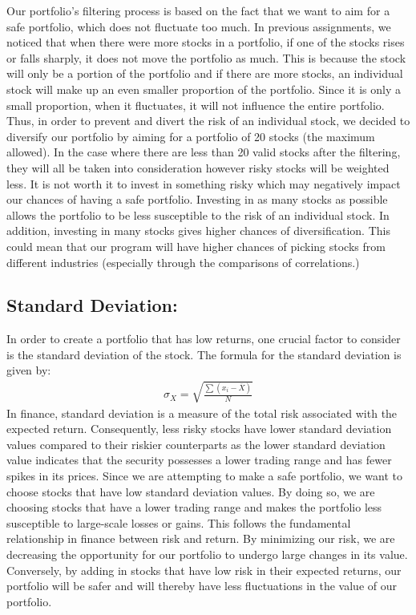 \documentclass[11pt]{article}
\begin{document}
Our portfolio's filtering process is based on the fact that we want to
aim for a safe portfolio, which does not fluctuate too much. In previous
assignments, we noticed that when there were more stocks in a portfolio,
if one of the stocks rises or falls sharply, it does not move the
portfolio as much. This is because the stock will only be a portion of
the portfolio and if there are more stocks, an individual stock will
make up an even smaller proportion of the portfolio. Since it is only a
small proportion, when it fluctuates, it will not influence the entire
portfolio. Thus, in order to prevent and divert the risk of an
individual stock, we decided to diversify our portfolio by aiming for a
portfolio of 20 stocks (the maximum allowed). In the case where there
are less than 20 valid stocks after the filtering, they will all be
taken into consideration however risky stocks will be weighted less. It
is not worth it to invest in something risky which may negatively impact
our chances of having a safe portfolio. Investing in as many stocks as
possible allows the portfolio to be less susceptible to the risk of an
individual stock. In addition, investing in many stocks gives higher
chances of diversification. This could mean that our program will have
higher chances of picking stocks from different industries (especially
through the comparisons of correlations.)

    \hypertarget{standard-deviation}{%
\subsection{Standard Deviation:}\label{standard-deviation}}

In order to create a portfolio that has low returns, one crucial factor
to consider is the standard deviation of the stock. The formula for the
standard deviation is given by: \begin{align*}
\sigma_X=\sqrt{\frac{\sum(x_i-\overline{X})}{N}}
\end{align*} In finance, standard deviation is a measure of the total
risk associated with the expected return. Consequently, less risky
stocks have lower standard deviation values compared to their riskier
counterparts as the lower standard deviation value indicates that the
security possesses a lower trading range and has fewer spikes in its
prices. Since we are attempting to make a safe portfolio, we want to
choose stocks that have low standard deviation values. By doing so, we
are choosing stocks that have a lower trading range and makes the
portfolio less susceptible to large-scale losses or gains. This follows
the fundamental relationship in finance between risk and return. By
minimizing our risk, we are decreasing the opportunity for our portfolio
to undergo large changes in its value. Conversely, by adding in stocks
that have low risk in their expected returns, our portfolio will be
safer and will thereby have less fluctuations in the value of our
portfolio.
\end{document}
